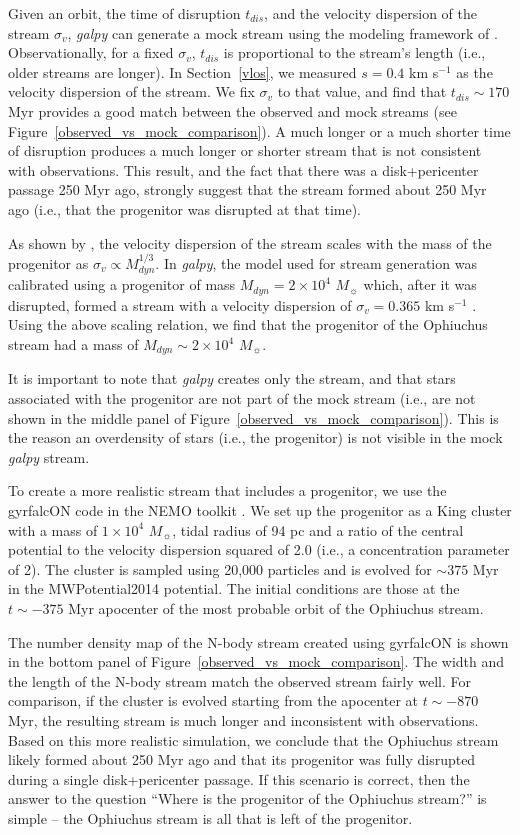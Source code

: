 \documentclass[iop]{emulateapj}
\begin{document}
Given an orbit, the time of disruption $t_{dis}$, and the velocity dispersion of
the stream $\sigma_v$, {\em galpy} can generate a mock stream using the modeling
framework of \citet{bov14}. Observationally, for a fixed $\sigma_v$, $t_{dis}$
is proportional to the stream's length (i.e., older streams are longer). In
Section~\ref{vlos}, we measured $s=0.4$ km s$^{-1}$ as the velocity dispersion
of the stream. We fix $\sigma_v$ to that value, and find that $t_{dis}\sim170$
Myr provides a good match between the observed and mock streams (see
Figure~\ref{observed_vs_mock_comparison}). A much longer or a much shorter time
of disruption produces a much longer or shorter stream that is not consistent
with observations. This result, and the fact that there was a disk+pericenter
passage 250 Myr ago, strongly suggest that the stream formed about 250 Myr ago
(i.e., that the progenitor was disrupted at that time).

As shown by \citet{sb13}, the velocity dispersion of the stream scales with the 
mass of the progenitor as $\sigma_v \propto M_{dyn}^{1/3}$. In {\em galpy}, the
model used for stream generation was calibrated using a progenitor of mass
$M_{dyn}=2\times10^4$ $M_\sun$ which, after it was disrupted, formed a stream
with a velocity dispersion of $\sigma_v=0.365$ km s$^{-1}$ \citep{bov14}. Using
the above scaling relation, we find that the progenitor of the Ophiuchus stream
had a mass of $M_{dyn}\sim2\times10^4$ $M_\sun$.

It is important to note that {\em galpy} creates only the stream, and that stars
associated with the progenitor are not part of the mock stream (i.e., are not
shown in the middle panel of Figure~\ref{observed_vs_mock_comparison}). This is
the reason an overdensity of stars (i.e., the progenitor) is not visible in the
mock {\em galpy} stream.

To create a more realistic stream that includes a progenitor, we use the
gyrfalcON code \citep{deh00,deh02} in the NEMO toolkit \citep{teu95}. We set up
the progenitor as a King cluster \citep{kin66} with a mass of $1\times10^4$
$M_\sun$, tidal radius of 94 pc and a ratio of the central potential to the
velocity dispersion squared of 2.0 (i.e., a concentration parameter of 2). The
cluster is sampled using 20,000 particles and is evolved for $\sim375$ Myr in
the MWPotential2014 potential. The initial conditions are those at the
$t\sim-375$ Myr apocenter of the most probable orbit of the Ophiuchus stream.

The number density map of the N-body stream created using gyrfalcON is shown in
the bottom panel of Figure~\ref{observed_vs_mock_comparison}. The width and the
length of the N-body stream match the observed stream fairly well. For
comparison, if the cluster is evolved starting from the apocenter at
$t\sim-870$ Myr, the resulting stream is much longer and inconsistent with
observations. Based on this more realistic simulation, we conclude that the
Ophiuchus stream likely formed about 250 Myr ago and that its progenitor was
fully disrupted during a single disk+pericenter passage. If this scenario is
correct, then the answer to the question ``Where is the progenitor of the
Ophiuchus stream?'' is simple -- the Ophiuchus stream is all that is left of
the progenitor.
\end{document}
